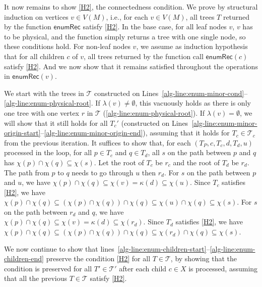     It now remains to show \ref{H2}, the connectedness condition.
    We prove by structural induction on vertices $v \in V(M)$, i.e., for each $v \in V(M)$, all trees $T$ returned by the function $\mathsf{enumRec}$ satisfy \ref{H2}.
    In the base case, for all leaf nodes $v$, $v$ has to be physical, and the function simply returns a tree with one single node, so these conditions hold.
    For non-leaf nodes $v$, we assume as induction hypothesis that for all children $c$ of $v$, all trees returned by the function call $\mathsf{enumRec}(c)$ satisfy \ref{H2}. And we now show that it remains satisfied throughout the operations in $\mathsf{enumRec}(v)$.
    
    We start with the trees in $\mathcal{T}$ constructed on Lines~\ref{alg-line:enum-minor-cond}--\ref{alg-line:enum-physical-root}.
    If $\lambda(v) \neq \emptyset$, this vacuously holds as there is only one tree with one vertex $r$ in $\mathcal{T}$ (\cref{alg-line:enum-physical-root}).
    If $\lambda(v) = \emptyset$, we will show that it still holds for all $T_c'$ (constructed on Lines~\ref{alg-line:enum-minor-origin-start}--\ref{alg-line:enum-minor-origin-end}), assuming that it holds for $T_c \in \mathcal{T}_c$ from the previous iteration. 
    It suffices to show that, for each $(T_P, c, T_c, d, T_d, u)$ processed in the loop,
    for all $p \in T_c$ and $q \in T_d$, all $s$ on the path between $p$ and $q$ has $\chi(p) \cap \chi(q) \subseteq \chi(s)$.
    Let the root of $T_c$ be $r_c$ and the root of $T_d$ be $r_d$.
    The path from $p$ to $q$ needs to go through $u$ then $r_d$.
    For $s$ on the path between $p$ and $u$, we have $\chi(p) \cap \chi(q) \subseteq \chi(v) = \kappa(d) \subseteq \chi(u)$.
    Since $T_c$ satisfies \ref{H2}, we have $\chi(p) \cap \chi(q) \subseteq (\chi(p) \cap \chi(q)) \cap \chi(q) \subseteq \chi(u) \cap \chi(q) \subseteq \chi(s)$.
    For $s$ on the path between $r_d$ and $q$, we have $\chi(p) \cap \chi(q) \subseteq \chi(v) = \kappa(d) \subseteq \chi(r_d)$.
    Since $T_d$ satisfies \ref{H2}, we have $\chi(p) \cap \chi(q) \subseteq (\chi(p) \cap \chi(q)) \cap \chi(q) \subseteq \chi(r_d) \cap \chi(q) \subseteq \chi(s)$.
    
    We now continue to show that lines~\cref{alg-line:enum-children-start}--\cref{alg-line:enum-children-end} preserve the condition \ref{H2} for all $T \in \mathcal{T}$, by showing that the condition is preserved for all $T' \in \mathcal{T}'$ after each child $c \in X$ is processed, assuming that all the previous $T \in \mathcal{T}$ satisfy \ref{H2}.
    
